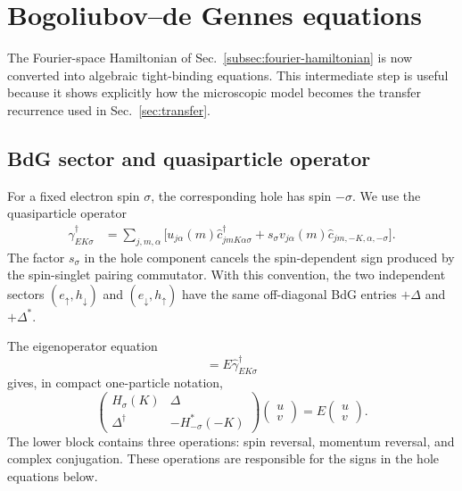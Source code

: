 \section{Bogoliubov--de Gennes equations}
\label{sec:bdg}

The Fourier-space Hamiltonian of Sec.~\ref{subsec:fourier-hamiltonian} is now converted into algebraic tight-binding equations.  This intermediate step is useful because it shows explicitly how the microscopic model becomes the transfer recurrence used in Sec.~\ref{sec:transfer}.

\subsection{BdG sector and quasiparticle operator}
\label{subsec:bdg-sector}

For a fixed electron spin $\sigma$, the corresponding hole has spin $-\sigma$.  We use the quasiparticle operator
\begin{align}
    \hat\gamma_{EK\sigma}^{\dagger}
    &=
    \sum_{j,m,\alpha}
    \Big[
        u_{j\alpha}(m)
        \hat c_{jmK\alpha\sigma}^{\dagger}
        +
        s_\sigma v_{j\alpha}(m)
        \hat c_{jm,-K,\alpha,-\sigma}
    \Big].
    \label{eq:qp-operator}
\end{align}
The factor $s_\sigma$ in the hole component cancels the spin-dependent sign produced by the spin-singlet pairing commutator.  With this convention, the two independent sectors $(e_\uparrow,h_\downarrow)$ and $(e_\downarrow,h_\uparrow)$ have the same off-diagonal BdG entries $+\Delta$ and $+\Delta^*$.

The eigenoperator equation
\begin{equation}
    [\hat H^{(g)},\hat\gamma_{EK\sigma}^{\dagger}]
    =
    E\hat\gamma_{EK\sigma}^{\dagger}
    \label{eq:eigenoperator}
\end{equation}
gives, in compact one-particle notation,
\begin{equation}
    \begin{pmatrix}
        H_\sigma(K) & \Delta\\
        \Delta^\dagger & -H^*_{-\sigma}(-K)
    \end{pmatrix}
    \begin{pmatrix}
        u\\v
    \end{pmatrix}
    =
    E
    \begin{pmatrix}
        u\\v
    \end{pmatrix}.
    \label{eq:BdG-block}
\end{equation}
The lower block contains three operations: spin reversal, momentum reversal, and complex conjugation.  These operations are responsible for the signs in the hole equations below.

